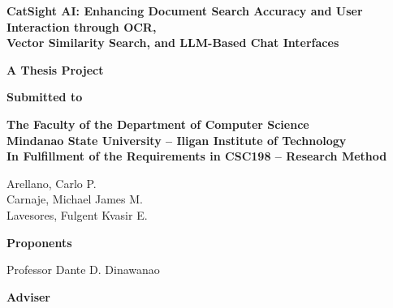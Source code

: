 \begin{titlepage}
  \centering
  \singlespacing
  {\bfseries CatSight AI: Enhancing Document Search Accuracy and User Interaction through OCR,\\[4pt]
   Vector Similarity Search, and LLM-Based Chat Interfaces\par}
  \vspace{2.2cm}
  {\bfseries A Thesis Project\par}
  \vspace{1cm}
  {\bfseries Submitted to\par}
  \vspace{1cm}
  {\bfseries The Faculty of the Department of Computer Science\\[4pt]
   Mindanao State University -- Iligan Institute of Technology\\[4pt]
   In Fulfillment of the Requirements in CSC198 -- Research Method\par}
  \vspace{2cm}
  Arellano, Carlo P.\\[4pt]
  Carnaje, Michael James M.\\[4pt]
  Lavesores, Fulgent Kvasir E.\\[4pt]
  {\bfseries Proponents\par}
  \vspace{2.5cm}
  Professor Dante D. Dinawanao\\[4pt]
  {\bfseries Adviser\par}
  \vfill
\end{titlepage}
